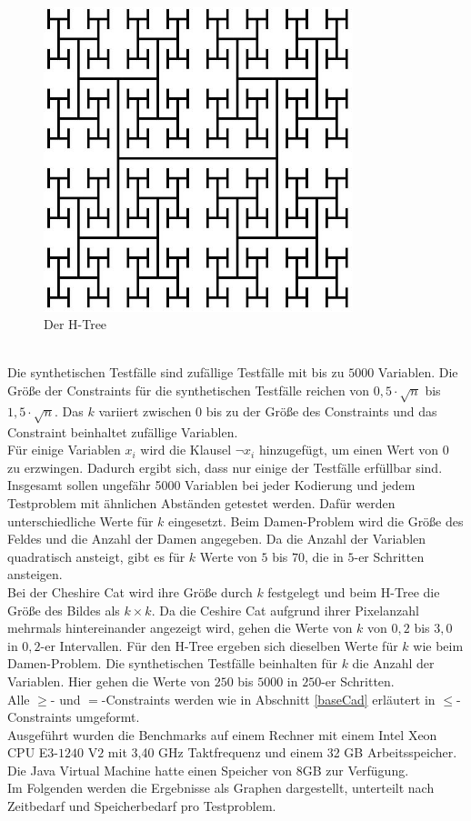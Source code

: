 \documentclass[a4,abstract=on]{scrartcl}
\begin{document}
\begin{figure}[H]
\centering
\includegraphics[width=9cm]{htree.png}
\caption{Der H-Tree}
\label{fig:htree}
\end{figure}
\ \\
Die synthetischen Testfälle sind zufällige Testfälle mit bis zu $5000$ Variablen. Die Größe der Constraints für die synthetischen Testfälle reichen von $0,5\cdot \sqrt{n}$ bis $1,5\cdot \sqrt{n}$. Das $k$ variiert zwischen $0$ bis zu der Größe des Constraints und das Constraint beinhaltet zufällige Variablen.\\
Für einige Variablen $x_i$ wird die Klausel $\neg x_i$ hinzugefügt, um einen Wert von $0$ zu erzwingen. Dadurch ergibt sich, dass nur einige der Testfälle erfüllbar sind.\\
Insgesamt sollen ungefähr 5000 Variablen bei jeder Kodierung und jedem Testproblem mit ähnlichen Abständen getestet werden. Dafür werden unterschiedliche Werte für $k$ eingesetzt. Beim Damen-Problem wird die Größe des Feldes und die Anzahl der Damen angegeben. Da die Anzahl der Variablen quadratisch ansteigt, gibt es für $k$ Werte von $5$ bis $70$, die in $5$-er Schritten ansteigen.\\
Bei der Cheshire Cat wird ihre Größe durch $k$ festgelegt und beim H-Tree die Größe des Bildes als $k \times k$. Da die Ceshire Cat aufgrund ihrer Pixelanzahl mehrmals hintereinander angezeigt wird, gehen die Werte von $k$ von $0,2$ bis $3,0$ in $0,2$-er Intervallen. Für den H-Tree ergeben sich dieselben Werte für $k$ wie beim Damen-Problem.
Die synthetischen Testfälle beinhalten für $k$ die Anzahl der Variablen. Hier gehen die Werte von $250$ bis $5000$ in $250$-er Schritten.\\
Alle $\geq$- und $=$-Constraints werden wie in Abschnitt \ref{baseCad} erläutert in $\leq$-Constraints umgeformt.\\
Ausgeführt wurden die Benchmarks auf einem Rechner mit einem Intel Xeon CPU E$3$-$1240$ V$2$ mit 3,40 GHz Taktfrequenz und einem 32 GB Arbeitsspeicher. Die Java Virtual Machine hatte einen Speicher von 8GB zur Verfügung.\\
Im Folgenden werden die Ergebnisse als Graphen dargestellt, unterteilt nach Zeitbedarf und Speicherbedarf pro Testproblem.
\end{document}
